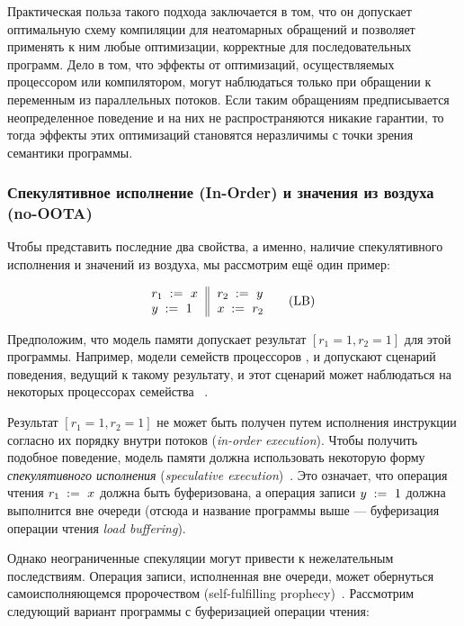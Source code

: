 Практическая польза такого подхода заключается в том,
что он допускает оптимальную схему компиляции для 
неатомарных обращений и позволяет применять к ним 
любые оптимизации, корректные для последовательных программ.
Дело в том, что эффекты от оптимизаций, осуществляемых процессором или компилятором, могут наблюдаться только при обращении к переменным из параллельных потоков. 
Если таким обращениям предписывается неопределенное поведение и на них 
не распространяются никакие гарантии, то тогда эффекты этих оптимизаций 
становятся неразличимы с точки зрения семантики программы. 
 
\subsubsection{Спекулятивное исполнение (In-Order) и значения из воздуха (no-OOTA)}
\label{sec:background:oota}

Чтобы представить последние два свойства, 
а именно, наличие спекулятивного исполнения и значений из воздуха, 
мы рассмотрим ещё один пример:

\begin{equation*}
\inarrII{
  \readInst{}{r_1}{x}     \\
  \writeInst{}{y}{1}      \\
}{
  \readInst{}{r_2}{y}     \\
  \writeInst{}{x}{r_2}    \\
}
\tag{LB}\label{ex:lb}
\end{equation*}

Предположим, что модель памяти допускает 
результат ${[r_1=1, r_2=1]}$ для этой программы. 
Например, модели семейств процессоров 
,  и \POWER
допускают  сценарий поведения, ведущий к такому результату, 
и этот сценарий может наблюдаться на некоторых процессорах семейства 
~\cite{Maranget-al:Tutorial2012}.

Результат ${[r_1=1, r_2=1]}$ не может быть получен 
путем исполнения инструкции согласно их порядку внутри потоков (\emph{in-order execution}).
Чтобы получить подобное поведение, 
модель памяти должна  использовать 
некоторую форму \emph{спекулятивного исполнения}
(\emph{speculative execution})~\cite{Boudol-Petri:ESOP10, Boehm-Demsky:MSPC14}.
Это означает, что  операция чтения $r_1\;:=_{}\;x$
должна быть буферизована, а операция записи $y\;:=_{}\;1$ 
должна выполнится вне очереди 
(отсюда и название программы выше --- 
буферизация операции чтения \emph{load buffering}).

Однако неограниченные спекуляции могут привести 
к нежелательным последствиям. 
Операция записи, исполненная вне очереди, может обернуться
самоисполняющемся пророчеством (self-fulfilling prophecy)~\cite{Boehm-Demsky:MSPC14}. 
Рассмотрим следующий вариант программы с буферизацией операции чтения:

